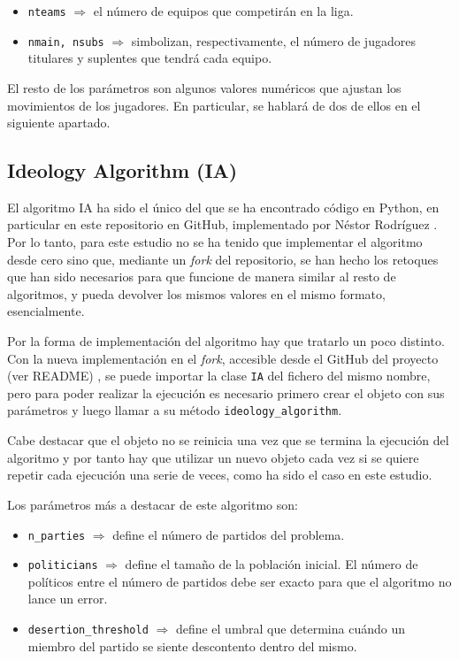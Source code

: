 \begin{itemize}
	\item \texttt{nteams} $\Rightarrow$ el número de equipos que competirán en la liga.
	\item \texttt{nmain, nsubs} $\Rightarrow$ simbolizan, respectivamente, el número de jugadores titulares y suplentes que tendrá cada equipo.
\end{itemize}

El resto de los parámetros son algunos valores numéricos que ajustan los movimientos de los jugadores. En particular, se hablará de dos de ellos en el siguiente apartado.

\subsection{Ideology Algorithm (IA)}

El algoritmo IA ha sido el único del que se ha encontrado código en Python, en particular en este repositorio en GitHub, implementado por Néstor Rodríguez \cite{ia-github}. Por lo tanto, para este estudio no se ha tenido que implementar el algoritmo desde cero sino que, mediante un \textit{fork} del repositorio, se han hecho los retoques que han sido necesarios para que funcione de manera similar al resto de algoritmos, y pueda devolver los mismos valores en el mismo formato, esencialmente.

Por la forma de implementación del algoritmo hay que tratarlo un poco distinto. Con la nueva implementación en el \textit{fork}, accesible desde el GitHub del proyecto (ver README) \cite{repositorio-tfg}, se puede importar la clase \texttt{IA} del fichero del mismo nombre, pero para poder realizar la ejecución es necesario primero crear el objeto con sus parámetros y luego llamar a su método \texttt{ideology\_algorithm}.

Cabe destacar que el objeto no se reinicia una vez que se termina la ejecución del algoritmo y por tanto hay que utilizar un nuevo objeto cada vez si se quiere repetir cada ejecución una serie de veces, como ha sido el caso en este estudio.

Los parámetros más a destacar de este algoritmo son:

\begin{itemize}
	\item \texttt{n\_parties} $\Rightarrow$ define el número de partidos del problema.
	\item \texttt{politicians} $\Rightarrow$ define el tamaño de la población inicial. El número de políticos entre el número de partidos debe ser exacto para que el algoritmo no lance un error.
	\item \texttt{desertion\_threshold} $\Rightarrow$ define el umbral que determina cuándo un miembro del partido se siente descontento dentro del mismo.
\end{itemize}

